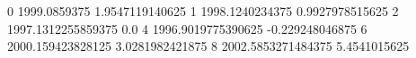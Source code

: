 0 1999.0859375 1.9547119140625
1 1998.1240234375 0.9927978515625
2 1997.1312255859375 0.0
4 1996.9019775390625 -0.229248046875
6 2000.159423828125 3.0281982421875
8 2002.5853271484375 5.4541015625
